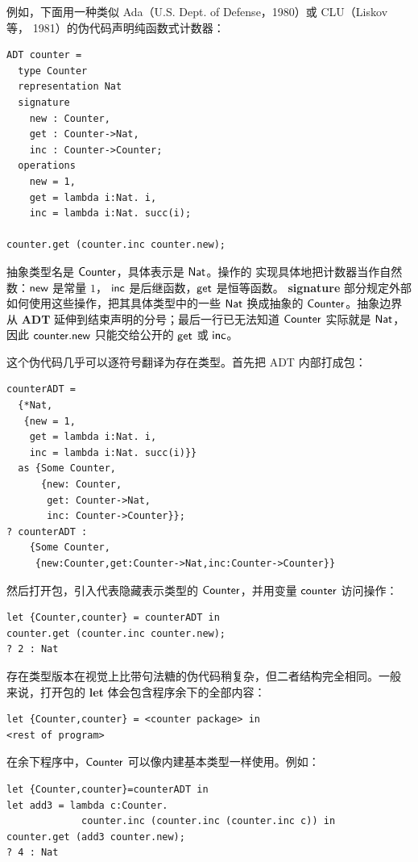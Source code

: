 例如，下面用一种类似 Ada（U.S. Dept. of Defense，1980）或 CLU（Liskov 等，
1981）的伪代码声明纯函数式计数器：
\begin{lstlisting}
ADT counter =
  type Counter
  representation Nat
  signature
    new : Counter,
    get : Counter->Nat,
    inc : Counter->Counter;
  operations
    new = 1,
    get = lambda i:Nat. i,
    inc = lambda i:Nat. succ(i);

counter.get (counter.inc counter.new);
\end{lstlisting}
抽象类型名是 \(\mathsf{Counter}\)，具体表示是 \(\mathsf{Nat}\)。操作的
实现具体地把计数器当作自然数：\(\mathsf{new}\) 是常量 \(1\)，
\(\mathsf{inc}\) 是后继函数，\(\mathsf{get}\) 是恒等函数。
\textbf{signature} 部分规定外部如何使用这些操作，把其具体类型中的一些
\(\mathsf{Nat}\) 换成抽象的 \(\mathsf{Counter}\)。抽象边界从
\textbf{ADT} 延伸到结束声明的分号；最后一行已无法知道
\(\mathsf{Counter}\) 实际就是 \(\mathsf{Nat}\)，因此
\(\mathsf{counter.new}\) 只能交给公开的 \(\mathsf{get}\) 或
\(\mathsf{inc}\)。

这个伪代码几乎可以逐符号翻译为存在类型。首先把 ADT 内部打成包：
\begin{lstlisting}
counterADT =
  {*Nat,
   {new = 1,
    get = lambda i:Nat. i,
    inc = lambda i:Nat. succ(i)}}
  as {Some Counter,
      {new: Counter,
       get: Counter->Nat,
       inc: Counter->Counter}};
? counterADT :
    {Some Counter,
     {new:Counter,get:Counter->Nat,inc:Counter->Counter}}
\end{lstlisting}
然后打开包，引入代表隐藏表示类型的 \(\mathsf{Counter}\)，并用变量
\(\mathsf{counter}\) 访问操作：
\begin{lstlisting}
let {Counter,counter} = counterADT in
counter.get (counter.inc counter.new);
? 2 : Nat
\end{lstlisting}
存在类型版本在视觉上比带句法糖的伪代码稍复杂，但二者结构完全相同。一般
来说，打开包的 \textbf{let} 体会包含程序余下的全部内容：
\begin{lstlisting}
let {Counter,counter} = <counter package> in
<rest of program>
\end{lstlisting}
在余下程序中，\(\mathsf{Counter}\) 可以像内建基本类型一样使用。例如：
\begin{lstlisting}
let {Counter,counter}=counterADT in
let add3 = lambda c:Counter.
             counter.inc (counter.inc (counter.inc c)) in
counter.get (add3 counter.new);
? 4 : Nat
\end{lstlisting}

